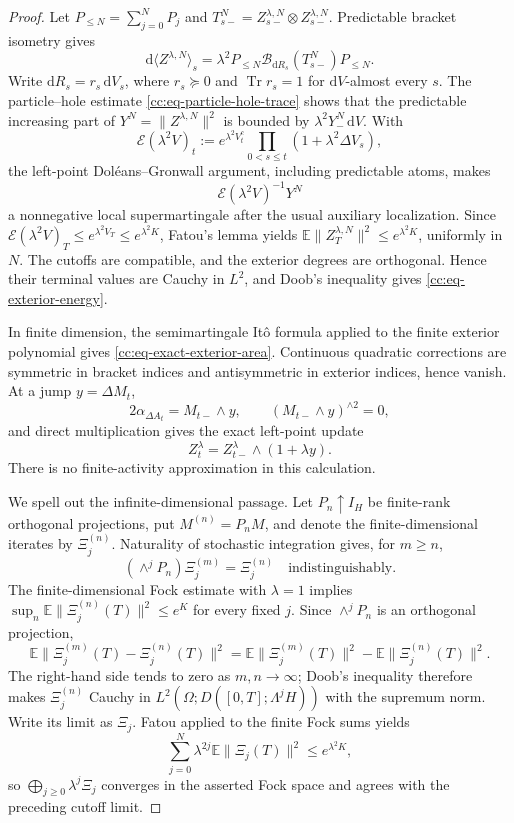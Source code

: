 \documentclass[10pt,reqno]{amsart}
\theoremstyle{plain}
\theoremstyle{definition}
\theoremstyle{remark}
\begin{document}
\begin{proof}
Let \(P_{\leq N}=\sum_{j=0}^NP_j\) and
\(T_{s-}^N=Z_{s-}^{\lambda,N}\otimes Z_{s-}^{\lambda,N}\).  Predictable
bracket isometry gives
\begin{equation}
 \mathrm d\langle Z^{\lambda,N}\rangle_s
 =\lambda^2P_{\leq N}
   \mathcal B_{\mathrm dR_s}(T_{s-}^N)P_{\leq N}.
 \label{cc:eq-exterior-Fock-bracket}
\end{equation}
Write \(\mathrm dR_s=r_s\,\mathrm dV_s\), where
\(r_s\succeq0\) and \(\operatorname{Tr}r_s=1\) for
\(\mathrm dV\)-almost every \(s\).  The particle--hole estimate
\eqref{cc:eq-particle-hole-trace} shows that the predictable increasing
part of \(Y^N=\|Z^{\lambda,N}\|^2\) is bounded by
\(
 \lambda^2Y^N_{-}\,\mathrm dV
\).
With
\[
 \mathcal E(\lambda^2V)_t
 :=e^{\lambda^2V_t^c}
   \prod_{0<s\leq t}(1+\lambda^2\Delta V_s),
\]
the left-point Dol\'eans--Gronwall argument, including predictable atoms,
makes
\[
 \mathcal E(\lambda^2V)^{-1}Y^N
\]
a nonnegative local supermartingale after the usual auxiliary localization.
Since
\(
 \mathcal E(\lambda^2V)_T
 \leq e^{\lambda^2V_T}\leq e^{\lambda^2K}
\), Fatou's lemma yields
\(
 \mathbb E\|Z_T^{\lambda,N}\|^2\leq e^{\lambda^2K}
\), uniformly in \(N\).  The cutoffs are compatible, and the exterior
degrees are orthogonal.  Hence their terminal values are Cauchy in \(L^2\),
and Doob's inequality gives \eqref{cc:eq-exterior-energy}.

In finite dimension, the semimartingale It\^o formula applied to the finite
exterior polynomial gives \eqref{cc:eq-exact-exterior-area}.  Continuous
quadratic corrections are symmetric in bracket indices and antisymmetric in
exterior indices, hence vanish.  At a jump \(y=\Delta M_t\),
\[
 2\alpha_{\Delta A_t}=M_{t-}\wedge y,
 \qquad (M_{t-}\wedge y)^{\wedge2}=0,
\]
and direct multiplication gives the exact left-point update
\[
 Z_t^\lambda=Z_{t-}^\lambda\wedge(1+\lambda y).
\]
There is no finite-activity approximation in this calculation.

We spell out the infinite-dimensional passage.  Let $P_n\uparrow I_H$ be
finite-rank orthogonal projections, put $M^{(n)}=P_nM$, and denote the
finite-dimensional iterates by $\Xi_j^{(n)}$.  Naturality of stochastic
integration gives, for $m\ge n$,
\begin{equation}
 (\wedge^jP_n)\Xi_j^{(m)}=\Xi_j^{(n)}
 \quad\text{indistinguishably}.
 \label{cc:eq-exterior-projection-compatibility}
\end{equation}
The finite-dimensional Fock estimate with $\lambda=1$ implies
$\sup_n\mathbb E\|\Xi_j^{(n)}(T)\|^2\le e^K$ for every fixed $j$.
Since $\wedge^jP_n$ is an orthogonal projection,
\[
 \mathbb E\|\Xi_j^{(m)}(T)-\Xi_j^{(n)}(T)\|^2
 =\mathbb E\|\Xi_j^{(m)}(T)\|^2
  -\mathbb E\|\Xi_j^{(n)}(T)\|^2.
\]
The right-hand side tends to zero as $m,n\to\infty$; Doob's inequality
therefore makes $\Xi_j^{(n)}$ Cauchy in
$L^2(\Omega;D([0,T];\Lambda^jH))$ with the supremum norm.  Write its limit as
$\Xi_j$.  Fatou applied to the finite Fock sums yields
\[
 \sum_{j=0}^N\lambda^{2j}\mathbb E\|\Xi_j(T)\|^2
 \le e^{\lambda^2K},
\]
so $\bigoplus_{j\ge0}\lambda^j\Xi_j$ converges in the asserted Fock space
and agrees with the preceding cutoff limit.


\end{proof}
\end{document}
